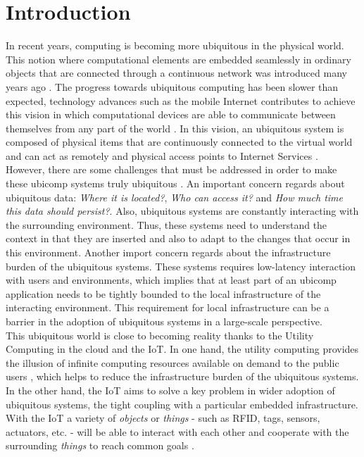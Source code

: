 
\chapter{Introduction}
\label{chapter:introduction}
In recent years, computing is becoming more ubiquitous in the physical world. This notion where
computational elements are embedded seamlessly in ordinary objects that are connected through a
continuous network was introduced many years ago \cite{weiser1991computer}. The progress
towards ubiquitous computing has been slower than expected, technology advances such as the mobile
Internet contributes to achieve this vision in which computational devices are able to communicate
between themselves from any part of the world \cite{gubbi2013internet}. In this vision, an ubiquitous
system is composed of physical items that are continuously connected to the virtual world and can act as
remotely and physical access points to Internet Services \cite{mattern2010internet}.\\

However, there are some challenges that must be addressed in order to make these \gls{ubicomp} systems
truly ubiquitous \cite{caceres2012ubicomp}. An important concern regards about ubiquitous data: \textit{Where it is located?},
\textit{Who can access it?} and \textit{How much time this data should persist?}. Also, ubiquitous systems
are constantly interacting with the surrounding environment. Thus, these systems need to understand
the context in that they are inserted and also to adapt to the changes that occur in this environment.
Another import concern regards about the infrastructure burden of the ubiquitous systems. These
systems requires low-latency interaction with users and environments, which implies that at least part
of an \gls{ubicomp} application needs to be tightly bounded to the local infrastructure of the interacting
environment. This requirement for local infrastructure can be a barrier in the adoption of ubiquitous
systems in a large-scale perspective.\\

This ubiquitous world is close to becoming reality thanks to the Utility Computing in the cloud
and the \gls{IoT}. In one hand, the utility computing provides the illusion of infinite computing
resources available on demand to the public users \cite{armbrust2010view}, which helps to reduce the
infrastructure burden of the ubiquitous systems. In the other hand, the \gls{IoT} aims to solve a key
problem in wider adoption of ubiquitous systems, the tight coupling with a particular embedded
infrastructure. With the \gls{IoT} a variety of \textit{objects} or \textit{things} - such as \gls{RFID},
tags, sensors, actuators, etc. - will be able to interact with each other and cooperate with the
surrounding \textit{things} to reach common goals \cite{atzori2010internet}.\\

